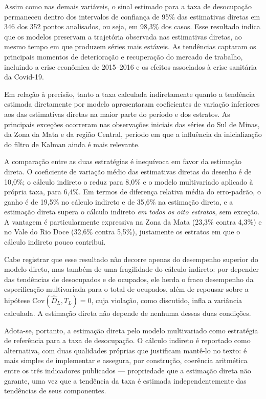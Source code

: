 \documentclass[rbe,wwwview]{econbr}
\begin{document}
Assim como nas demais variáveis, o sinal estimado para a taxa de desocupação permaneceu dentro dos intervalos de confiança de 95\% das estimativas diretas em 346 dos 352 pontos analisados, ou seja, em 98,3\% dos casos. Esse resultado indica que os modelos preservam a trajetória observada nas estimativas diretas, ao mesmo tempo em que produzem séries mais estáveis. As tendências captaram os principais momentos de deterioração e recuperação do mercado de trabalho, incluindo a crise econômica de 2015--2016 e os efeitos associados à crise sanitária da Covid-19.

Em relação à precisão, tanto a taxa calculada indiretamente quanto a tendência estimada diretamente por modelo apresentaram coeficientes de variação inferiores aos das estimativas diretas na maior parte do período e dos estratos. As principais exceções ocorreram nas observações iniciais das séries do Sul de Minas, da Zona da Mata e da região Central, período em que a influência da inicialização do filtro de Kalman ainda é mais relevante.

A comparação entre as duas estratégias é inequívoca em favor da estimação direta. O coeficiente de variação médio das estimativas diretas do desenho é de 10,0\%; o cálculo indireto o reduz para 8,0\% e o modelo multivariado aplicado à própria taxa, para 6,4\%. Em termos de diferença relativa média do erro-padrão, o ganho é de 19,5\% no cálculo indireto e de 35,6\% na estimação direta, e a estimação direta supera o cálculo indireto \textit{em todos os oito estratos}, sem exceção. A vantagem é particularmente expressiva na Zona da Mata (23,3\% contra 4,3\%) e no Vale do Rio Doce (32,6\% contra 5,5\%), justamente os estratos em que o cálculo indireto pouco contribui.

Cabe registrar que esse resultado não decorre apenas do desempenho superior do modelo direto, mas também de uma fragilidade do cálculo indireto: por depender das tendências de desocupados e de ocupados, ele herda o fraco desempenho da especificação multivariada para o total de ocupados, além de repousar sobre a hipótese \(\mathrm{Cov}(\hat{D}_L,T_L)=0\), cuja violação, como discutido, infla a variância calculada. A estimação direta não depende de nenhuma dessas duas condições.

Adota-se, portanto, a estimação direta pelo modelo multivariado como estratégia de referência para a taxa de desocupação. O cálculo indireto é reportado como alternativa, com duas qualidades próprias que justificam mantê-lo no texto: é mais simples de implementar e assegura, por construção, coerência aritmética entre os três indicadores publicados --- propriedade que a estimação direta não garante, uma vez que a tendência da taxa é estimada independentemente das tendências de seus componentes.
\end{document}
